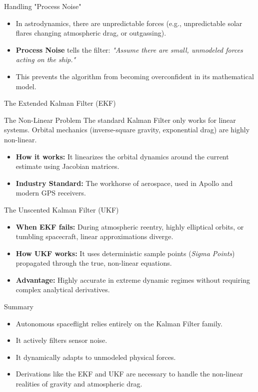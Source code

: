 \documentclass{beamer}
\begin{document}
\begin{frame}{Handling "Process Noise"}
    \begin{itemize}
        \item In astrodynamics, there are unpredictable forces (e.g., unpredictable solar flares changing atmospheric drag, or outgassing).
        \item \textbf{Process Noise} tells the filter: \textit{"Assume there are small, unmodeled forces acting on the ship."}
        \item This prevents the algorithm from becoming overconfident in its mathematical model.
    \end{itemize}
\end{frame}

\begin{frame}{The Extended Kalman Filter (EKF)}
    \begin{alertblock}{The Non-Linear Problem}
        The standard Kalman Filter only works for linear systems. Orbital mechanics (inverse-square gravity, exponential drag) are highly non-linear.
    \end{alertblock}
    \begin{itemize}
        \item \textbf{How it works:} It linearizes the orbital dynamics around the current estimate using Jacobian matrices.
        \item \textbf{Industry Standard:} The workhorse of aerospace, used in Apollo and modern GPS receivers.
    \end{itemize}
\end{frame}

\begin{frame}{The Unscented Kalman Filter (UKF)}
    \begin{itemize}
        \item \textbf{When EKF fails:} During atmospheric reentry, highly elliptical orbits, or tumbling spacecraft, linear approximations diverge.
        \item \textbf{How UKF works:} It uses deterministic sample points (\textit{Sigma Points}) propagated through the true, non-linear equations.
        \item \textbf{Advantage:} Highly accurate in extreme dynamic regimes without requiring complex analytical derivatives.
    \end{itemize}
\end{frame}

\begin{frame}{Summary}
    \begin{itemize}
        \item Autonomous spaceflight relies entirely on the Kalman Filter family.
        \item It actively filters sensor noise.
        \item It dynamically adapts to unmodeled physical forces.
        \item Derivations like the EKF and UKF are necessary to handle the non-linear realities of gravity and atmospheric drag.
    \end{itemize}
\end{frame}
\end{document}
